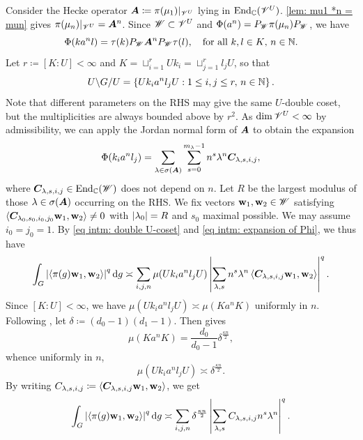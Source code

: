 \documentclass[a4paper, 10pt]{article}
\begin{document}
Consider the Hecke operator $\bm{A}\coloneq \pi(\mu_1)|_{\mathscr{V}^U}$ lying in $\operatorname{End}_{\mathbb{C}}(\mathscr{V}^U)$. \autoref{lem: mu1 *n = mun} gives $\pi(\mu_n)|_{\mathscr{V}^U} = \bm{A}^n$.
Since $\mathscr{W}\subset \mathscr{V}^U$ and $\Phi(a^n)=P_{\mathscr{W}}\pi(\mu_n) P_{\mathscr{W}}$, we have
\begin{equation*}
    \Phi(k a^n l) = \tau(k)P_{\mathscr{W}} \bm{A}^n P_{\mathscr{W}} \tau(l), \quad \text{for all $k,l\in K$, $n\in\mathbb{N}$.}
\end{equation*}
Let $r\coloneq [K:U]<\infty$ and $K = \sqcup_{i=1}^{r} Uk_i = \sqcup_{j=1}^{r} l_j U$, so that
\begin{equation}\label{eq intm: double U-coset}
    U\backslash G / U = \left\{ U k_i a^n l_j U : 1\leq i,j\leq r,\, n\in\mathbb{N} \right\}.
\end{equation}
Note that different parameters on the RHS may give the same $U$-double coset, but the multiplicities are always bounded above by $r^2$.
As $\dim \mathscr{V}^{U}<\infty$ by admissibility, we can apply the Jordan normal form of $\bm{A}$ to obtain the expansion
\begin{equation}\label{eq intm: expansion of Phi}
    \Phi(k_i a^n l_j) = \sum_{\lambda\in\sigma(\bm{A})} \sum_{s=0}^{m_{\lambda}-1} n^s \lambda^n \bm{C}_{\lambda,s,i,j},
\end{equation}
where $\bm{C}_{\lambda,s,i,j}\in \operatorname{End}_{\mathbb{C}}(\mathscr{W})$ does not depend on $n$.
Let $R$ be the largest modulus of those $\lambda\in\sigma(\bm{A})$ occurring on the RHS. We fix vectors $\mathbf{w}_1,\mathbf{w}_2\in\mathscr{W}$ satisfying $\left\langle\bm{C}_{\lambda_0,s_0,i_0,j_0}\mathbf{w}_1, \mathbf{w}_2 \right\rangle\ne 0$ with $\left| \lambda_0 \right|=R$ and $s_0$ maximal possible. We may assume $i_0=j_0=1$.
By \eqref{eq intm: double U-coset} and \eqref{eq intm: expansion of Phi}, we thus have
\begin{equation*}
    \int_G \left|\left\langle\pi(g)\mathbf{w}_1,\mathbf{w}_2 \right\rangle\right|^q\mathop{}\!\mathrm{d} g \asymp \sum_{i,j,n} \mu(Uk_i a^n l_jU) \left| \sum_{\lambda,s} n^s \lambda^n \left\langle\bm{C}_{\lambda,s,i,j}\mathbf{w}_1, \mathbf{w}_2 \right\rangle \right|^q.
\end{equation*}
Since $[K:U]<\infty$, we have $\mu(Uk_i a^n l_j U) \asymp \mu(Ka^n K)$ uniformly in $n$.
Following \cite[\S4]{heinig-laat2024group}, let $\delta\coloneq (d_0-1)(d_1-1)$. Then \cite[Prop 4.1]{heinig-laat2024group} gives
\begin{equation*}
    \mu(Ka^n K) = \frac{d_0}{d_0 - 1} \delta^{\frac{\kappa n}{2}},
\end{equation*}
whence uniformly in $n$,
\begin{equation*}
    \mu(U k_i a^n l_j U) \asymp \delta^{\frac{\kappa n}{2}}.
\end{equation*}
By writing $C_{\lambda,s,i,j}\coloneq \left\langle\bm{C}_{\lambda,s,i,j}\mathbf{w}_1, \mathbf{w}_2 \right\rangle$, we get
\begin{equation}\label{eq ppty: expansion of int Lq}
    \int_G \left|\left\langle\pi(g)\mathbf{w}_1,\mathbf{w}_2 \right\rangle\right|^q\mathop{}\!\mathrm{d} g \asymp \sum_{i,j,n} \delta^{\frac{\kappa n}{2}} \left| \sum_{\lambda,s } C_{\lambda,s,i,j} n^s \lambda^n  \right|^q.
\end{equation}
\end{document}
